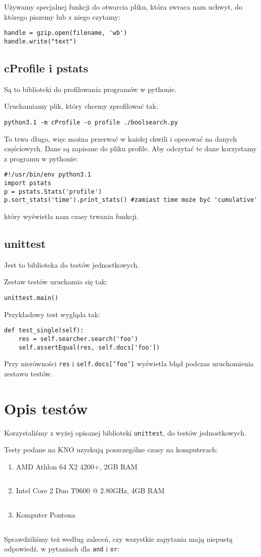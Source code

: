 \documentclass[11pt]{article}
\begin{document}
Używamy specjalnej funkcji do otwarcia pliku, która zwraca nam uchwyt, do którego piszemy lub z niego czytamy:
\begin{verbatim}
handle = gzip.open(filename, 'wb') 
handle.write("text")
\end{verbatim}
\subsection{cProfile i pstats}
Są to biblioteki do profilowania programów w pythonie.

Uruchamiamy plik, który chcemy zprofilować tak:
\begin{verbatim}
python3.1 -m cProfile -o profile ./boolsearch.py
\end{verbatim}
To trwa długo, więc można przerwać w każdej chwili i operować na danych częściowych. Dane są zapisane do pliku profile. Aby odczytać te dane korzystamy z programu w pythonie:
\begin{verbatim}
#!/usr/bin/env python3.1
import pstats
p = pstats.Stats('profile')
p.sort_stats('time').print_stats() #zamiast time może być 'cumulative'
\end{verbatim}
który wyświetla nam czasy trwania funkcji.
\subsection{unittest}
Jest to biblioteka do testów jednostkowych.

Zestaw testów uruchamia się tak:
\begin{verbatim}
unittest.main()
\end{verbatim}

Przykładowy test wygląda tak:
\begin{verbatim}
def test_single(self):
    res = self.searcher.search('foo')
    self.assertEqual(res, self.docs['foo'])
\end{verbatim}
Przy nierówności \texttt{res} i \texttt{self.docs['foo']} wyświetla błąd podczas uruchomienia zestawu testów.

\section{Opis testów}
Korzystaliśmy z wyżej opisanej biblioteki \texttt{unittest}, do testów jednostkowych. 

Testy podane na KNO uzyskują poszczególne czasy na komputerach:
\begin{enumerate}
\item AMD Athlon 64 X2 4200+, 2GB RAM
\begin{verbatim}
\end{verbatim}
\item Intel Core 2 Duo T9600 @ 2.80GHz, 4GB RAM
\begin{verbatim}
\end{verbatim}
\item Komputer Pontona
\begin{verbatim}
\end{verbatim}
\end{enumerate}

Sprawdziliśmy też według zaleceń, czy wszystkie zapytania mają niepustą odpowiedź, w pytaniach dla \texttt{and} i \texttt{or}:
\begin{verbatim}
\end{verbatim}
\end{document}

